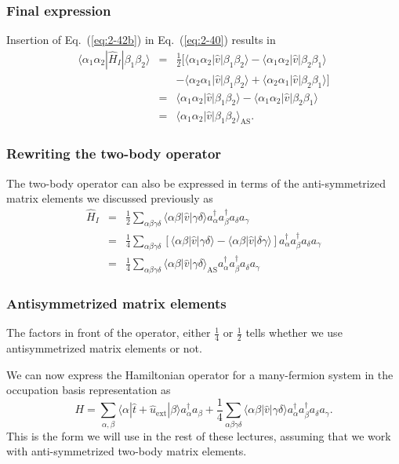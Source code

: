 \documentclass{beamer}
\begin{document}
\begin{frame}
\frametitle{Final expression}

Insertion of 
Eq.~(\ref{eq:2-42b}) in Eq.~(\ref{eq:2-40}) results in
\begin{align}
	\langle \alpha_1\alpha_2|\hat{H}_I|\beta_1\beta_2\rangle &=& \frac{1}{2} \big[ 
		\langle \alpha_1\alpha_2|\hat{v}|\beta_1\beta_2\rangle- \langle \alpha_1\alpha_2|\hat{v}|\beta_2\beta_1\rangle \nonumber \\
		&& - \langle \alpha_2\alpha_1|\hat{v}|\beta_1\beta_2\rangle + \langle \alpha_2\alpha_1|\hat{v}|\beta_2\beta_1\rangle \big] \nonumber \\
	&=& \langle \alpha_1\alpha_2|\hat{v}|\beta_1\beta_2\rangle - \langle \alpha_1\alpha_2|\hat{v}|\beta_2\beta_1\rangle \nonumber \\
	&=& \langle \alpha_1\alpha_2|\hat{v}|\beta_1\beta_2\rangle_{\mathrm{AS}}. \label{eq:2-43b}
\end{align}
\end{frame}

\begin{frame}
\frametitle{Rewriting the two-body operator}

The two-body operator can also be expressed in terms of the anti-symmetrized matrix elements we discussed previously as
\begin{align}
	\hat{H}_I &=& \frac{1}{2} \sum_{\alpha\beta\gamma\delta}  \langle \alpha \beta|\hat{v}|\gamma \delta\rangle
		a_\alpha^{\dagger} a_\beta^{\dagger} a_\delta a_\gamma \nonumber \\
	&=& \frac{1}{4} \sum_{\alpha\beta\gamma\delta} \left[ \langle \alpha \beta|\hat{v}|\gamma \delta\rangle -
		\langle \alpha \beta|\hat{v}|\delta\gamma \rangle \right] 
		a_\alpha^{\dagger} a_\beta^{\dagger} a_\delta a_\gamma \nonumber \\
	&=& \frac{1}{4} \sum_{\alpha\beta\gamma\delta} \langle \alpha \beta|\hat{v}|\gamma \delta\rangle_{\mathrm{AS}}
		a_\alpha^{\dagger} a_\beta^{\dagger} a_\delta a_\gamma \label{eq:2-45}
\end{align}
\end{frame}

\begin{frame}
\frametitle{Antisymmetrized matrix elements}

The factors in front of the operator, either  $\frac{1}{4}$ or 
$\frac{1}{2}$ tells whether we use antisymmetrized matrix elements or not. 

We can now express the Hamiltonian operator for a many-fermion system  in the occupation basis representation
as  
\begin{equation}
	H = \sum_{\alpha, \beta} \langle \alpha|\hat{t}+\hat{u}_{\mathrm{ext}}|\beta\rangle a_\alpha^{\dagger} a_\beta + \frac{1}{4} \sum_{\alpha\beta\gamma\delta}
		\langle \alpha \beta|\hat{v}|\gamma \delta\rangle a_\alpha^{\dagger} a_\beta^{\dagger} a_\delta a_\gamma. \label{eq:2-46b}
\end{equation}
This is the form we will use in the rest of these lectures, assuming that we work with anti-symmetrized two-body matrix elements.
\end{frame}
\end{document}
